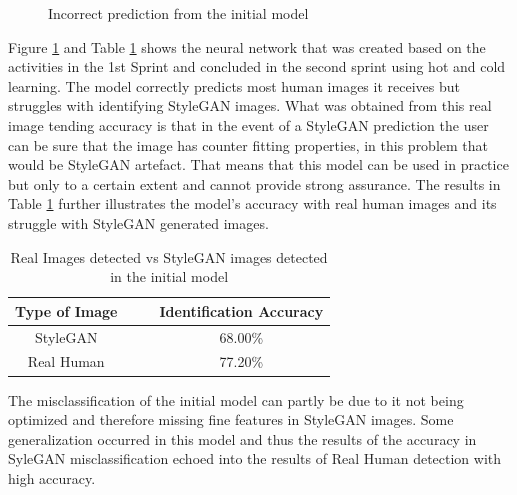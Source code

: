 \begin{figure}[H]%
\centering
{}%
\caption{Incorrect prediction from the initial model}%
\label{fig:reswrong}%
\end{figure}

Figure \ref{fig:reswrong}  and Table \ref{tabl:res1} shows the neural network that was created based on the activities in the 1st Sprint and concluded in the second sprint using hot and cold learning. The model correctly predicts most human images it receives but struggles with identifying StyleGAN images. What was obtained from this real image tending accuracy is that in the event of a StyleGAN prediction the user can be sure that the image has counter fitting properties, in this problem that would be StyleGAN artefact. That means that this model can be used in practice but only to a certain extent and cannot provide strong assurance. The results in Table \ref{tabl:res1} further illustrates the model's accuracy with real human images and its struggle with StyleGAN generated images.

\begin{table}[H]%
\caption{Real Images detected vs StyleGAN images detected in the initial model}
\label{tabl:res1}
\centering
\large
\begin{tabular}{cccc}
\hline
Type of Image & & & Identification Accuracy  \\ 
\hline
StyleGAN & & & 68.00\% \\
Real Human & & & 77.20\% \\
\hline
\end{tabular}

\end{table} 

The misclassification of the initial model can partly be due to it not being optimized and therefore missing fine features in StyleGAN images. Some generalization occurred in this model and thus the results of the accuracy in SyleGAN misclassification echoed into the results of Real Human detection with high accuracy.

